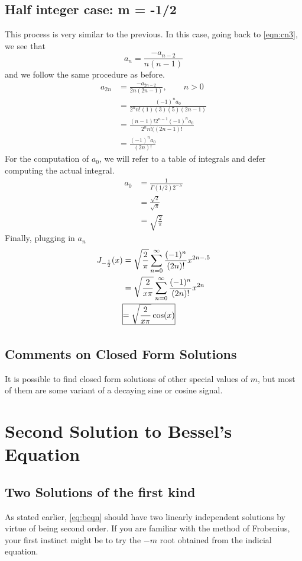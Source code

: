 \documentclass[]{article}
\begin{document}
\subsection{Half integer case: m = -1/2}
This process is very similar to the previous. In this case, going back to \eqref{eqn:cn3}, we see that 
\begin{equation}
	a_n = \frac{-a_{n-2}}{n(n-1)}
\end{equation}
and we follow the same procedure as before.
\begin{align}
	a_{2n} &= \frac{-a_{2n-2}}{2n(2n-1)}, \qquad n > 0\\
	&= \frac{(-1)^na_0}{2^nn!(1)(3)(5)(2n-1)} \nonumber \\
	&=\frac{(n-1)!2^{n-1}(-1)^na_0}{2^nn!((2n-1)!} \nonumber \\
	& = \frac{(-1)^na_0}{(2n)!}
\end{align}
For the computation of $a_0$, we will refer to a table of integrals and defer computing the actual integral.
\begin{align*}
	a_0 & = \frac{1}{\Gamma(1/2) 2^{-.5}}\\
		&=  \frac{\sqrt{2}}{\sqrt{\pi}}\\
		&= \sqrt{\frac{2}{\pi}}
\end{align*}
Finally, plugging in $a_n$
\begin{align}
	J_{-\frac{1}{2}}(x) &=  \sqrt{\frac{2}{\pi}} \sum_{n = 0}^{\infty}
	\frac{(-1)^n}{(2n)!} 
	x^{2n-.5} \nonumber \\
	&=  \sqrt{\frac{2}{x\pi}} \sum_{n = 0}^{\infty}
	\frac{(-1)^n}{(2n)!}
	x^{2n} \\
	&\frame{$\displaystyle =\sqrt{\frac{2}{x\pi}} \cos(x)$}
\end{align}
\subsection{Comments on Closed Form Solutions}
It is possible to find closed form solutions of other special values of $m$, but most of them are some variant of a decaying sine or cosine signal.

\section{Second Solution to Bessel's Equation}
\subsection{Two Solutions of the first kind}
As stated earlier, \eqref{eq:beqn} should have two linearly independent solutions by virtue of being second order. If you are familiar with the method of Frobenius, your first instinct might be to try the $-m$ root obtained from the indicial equation.
\end{document}

